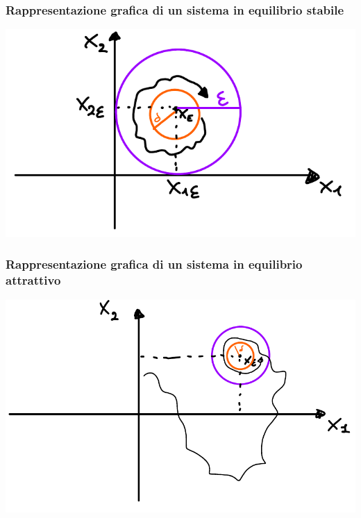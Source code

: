 \documentclass{article}
\begin{document}
\subsubsection*{Rappresentazione grafica di un sistema in equilibrio stabile}
\begin{center}
    \includegraphics[scale=0.3]{Images/Equilibrio_stabile.png}
\end{center}

\subsubsection*{Rappresentazione grafica di un sistema in equilibrio attrattivo}
\begin{center}
    \includegraphics[scale=0.3]{Images/Equilibrio_attrattivo.png}
\end{center}
\end{document}
